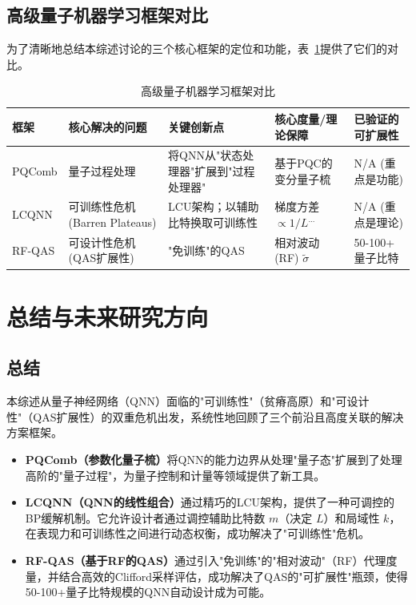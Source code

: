 \documentclass[12pt,a4paper]{article}
\begin{document}
\subsection{高级量子机器学习框架对比}

为了清晰地总结本综述讨论的三个核心框架的定位和功能，表~\ref{tab:framework_comparison}提供了它们的对比。

\begin{table}[htbp]
\centering
\caption{高级量子机器学习框架对比}
\label{tab:framework_comparison}
\small
\begin{tabular}{p{2cm}p{3cm}p{3cm}p{3cm}p{2.5cm}}
\toprule
\textbf{框架} & \textbf{核心解决的问题} & \textbf{关键创新点} & \textbf{核心度量/理论保障} & \textbf{已验证的可扩展性} \\
\midrule
PQComb & 量子过程处理 & 将QNN从"状态处理器"扩展到"过程处理器" & 基于PQC的变分量子梳 & N/A (重点是功能) \\
\midrule
LCQNN & 可训练性危机 (Barren Plateaus) & LCU架构；以辅助比特换取可训练性 & 梯度方差 $\propto 1/L^{...}$ & N/A (重点是理论) \\
\midrule
RF-QAS & 可设计性危机 (QAS扩展性) & "免训练"的QAS & 相对波动(RF) $\tilde{\sigma}$ & 50-100+ 量子比特 \\
\bottomrule
\end{tabular}
\end{table}

\section{总结与未来研究方向}

\subsection{总结}

本综述从量子神经网络（QNN）面临的"可训练性"（贫瘠高原）和"可设计性"（QAS扩展性）的双重危机出发，系统性地回顾了三个前沿且高度关联的解决方案框架。

\begin{itemize}
\item \textbf{PQComb（参数化量子梳）}将QNN的能力边界从处理"量子态"扩展到了处理高阶的"量子过程"，为量子控制和计量等领域提供了新工具。

\item \textbf{LCQNN（QNN的线性组合）}通过精巧的LCU架构，提供了一种可调控的BP缓解机制。它允许设计者通过调控辅助比特数 $m$（决定 $L$）和局域性 $k$，在表现力和可训练性之间进行动态权衡，成功解决了"可训练性"危机。

\item \textbf{RF-QAS（基于RF的QAS）}通过引入"免训练"的"相对波动"（RF）代理度量，并结合高效的Clifford采样评估，成功解决了QAS的"可扩展性"瓶颈，使得50-100+量子比特规模的QNN自动设计成为可能。
\end{itemize}
\end{document}
